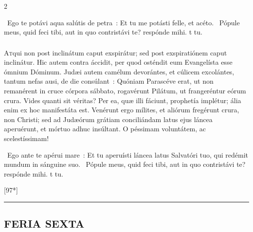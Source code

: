 \documentclass[9pt,twoside]{extarticle}
\begin{document}
\begin{multicols}{2}
\begin{tightlist}{}
\item {}~Ego te potávi aqua salútis de petra~: \textred{*} Et tu me potásti felle, et acéto. ~Pópule meus, quid feci tibi, aut in quo contristávi te? respónde mihi. t tu.
\end{tightlist}

\subsubsection*{\center{}}
\lettrine{A}tqui non post inclinátum caput exspirátur; sed post exspiratiónem caput inclinátur. Hic autem contra áccidit, per quod osténdit eum Evangelísta esse ómnium Dóminum. Judæi autem camélum devorántes, et cúlicem excolántes, tantum nefas ausi, de die consúlant~: Quóniam Parascéve erat, ut non remanérent in cruce córpora sábbato, rogavérunt Pilátum, ut frangeréntur eórum crura. Vides quanti sit véritas? Per ea, quæ illi fáciunt, prophetía implétur; ália enim ex hoc manifestáta est. Venérunt ergo mílites, et aliórum fregérunt crura, non Christi; sed ad Judæórum grátiam conciliándam latus ejus láncea aperuérunt, et mórtuo adhuc insúltant. O péssimam voluntátem, ac scelestíssimam!

\begin{tightlist}{}
\item {}~Ego ante te apérui mare~: \textred{*} Et tu aperuísti láncea latus Salvatóri tuo, qui redémit mundum in sánguine suo. ~Pópule meus, quid feci tibi, aut in quo contristávi te? respónde mihi. t tu.
\end{tightlist}

\begin{tightlist}{}
\item {} [97*]
\end{tightlist}
\begin{center}\textcolor{red}{\rule{\linewidth}{0.5pt}} \end{center}   

\subsection*{\center \textsc{FERIA SEXTA}\\
}

\end{multicols}
\end{document}
